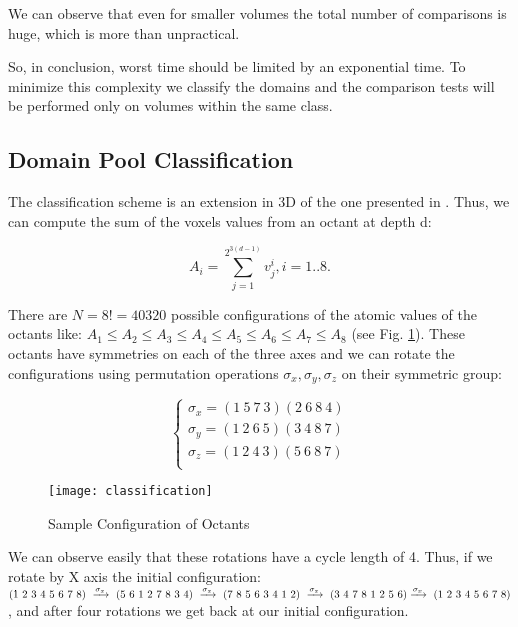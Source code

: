 \documentclass[10pt, conference, compsocconf]{IEEEtran}
\begin{document}
We can observe that even for smaller volumes the total number of comparisons is huge, which is more than unpractical.

So, in conclusion, worst time should be limited by an exponential time. To minimize this complexity we classify the domains and the comparison tests will be performed only on volumes within the same class.

\subsection{Domain Pool Classification}
The classification scheme is an extension in 3D of the one presented in \cite{Fis91}. Thus, we can compute the sum of the voxels values from an octant at depth d: 

\begin{equation}
\displaystyle A_i = \sum_{j=1}^{2^{3(d-1)}}v_j^i, i = 1..8.
\end{equation}

There are $N = 8! = 40320$ possible configurations of the atomic values of the octants like: $A_1 \leq A_2 \leq A_3 \leq A_4 \leq A_5 \leq A_6 \leq A_7 \leq A_8$ (see Fig. \ref{fig:classification}). These octants have symmetries on each of the three axes and we can rotate the configurations using permutation operations $\sigma_x, \sigma_y, \sigma_z$ on their symmetric group:

\begin{equation}
\left\{ \begin{array}{c}
\sigma_x = (1~5~7~3)(2~6~8~4) \\ 
\sigma_y = (1~2~6~5)(3~4~8~7) \\
\sigma_z = (1~2~4~3)(5~6~8~7) \\
\end{array}\right.
\end{equation}


\begin{figure}[t]
\centering
\texttt{[image: classification]}
\caption{Sample Configuration of Octants}
\label{fig:classification}
\end{figure}

We can observe easily that these rotations have a cycle length of 4. Thus, if we rotate by X axis the initial configuration:
$(1~2~3~4~5~6~7~8)~\xrightarrow{\sigma_x}~(5~6~1~2~7~8~3~4)~\xrightarrow{\sigma_x} \\ ~(7~8~5~6~3~4~1~2)~\xrightarrow{\sigma_x}~(3~4~7~8~1~2~5~6) \xrightarrow{\sigma_x}~(1~2~3~4~5~6~7~8)$, and after four rotations we get back at our initial configuration.
\end{document}
